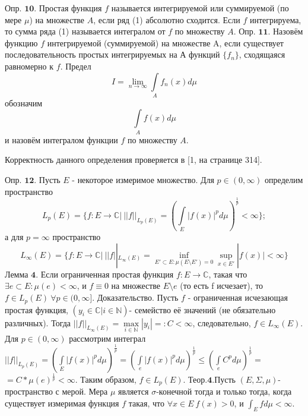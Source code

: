 \documentclass[a4paper,14pt]{article}
\begin{document}
$\textbf{Опр. 10.}$ Простая функция $f$ называется интегрируемой или суммируемой (по мере $\mu$) на множестве $A$, если ряд (1) абсолютно сходится. Если $f$ интегрируема, то сумма ряда (1) называется интегралом от $f$ по множеству $A$.\newline
$\textbf{Опр. 11.}$ Назовём функцию $f$ интегрируемой (суммируемой) на множестве A, если существует последовательность простых интегрируемых на А функций $\{f_n\}$, сходящаяся равномерно к $f$. Предел $$I=\lim\limits_{n\rightarrow\infty}\int\limits_A f_n(x)d\mu$$ обозначим $$\int\limits_A f(x)d\mu$$ и назовём интегралом функции $f$ по множеству $A$.

Корректность данного определения проверяется в [1, на странице 314].\newline

$\textbf{Опр. 12.}$ Пусть $E$ - некоторое измеримое множество. Для $p\in(0,\infty)$ определим пространство $$L_p(E)=\{f:E\rightarrow\mathbb{C}|\ ||f||_{L_p(E)}=(\int\limits_E |f(x)|^p d\mu)^{\frac{1}{p}}<\infty\};$$ а для $p=\infty$ пространство $$L_{\infty}(E)=\{f:E\rightarrow\mathbb{C}|\ ||f||_{L_{\infty}(E)}=\inf\limits_{E'\subset E:\mu (E\setminus E')=0}\sup\limits_{x\in E'}|f(x)|<\infty\}$$
$\textbf{Лемма 4.}$ Если ограниченная простая функция $f:E\rightarrow\mathbb{C}$, такая что $\exists e\subset E:\mu(e)<\infty$, и $f\equiv 0$ на множестве $E\setminus e$ (то есть f исчезает), то $f\in L_p(E)\ \forall p\in(0,\infty]$.\newline
$\textbf{Доказательство.}$ Пусть $f$ - ограниченная исчезающая простая функция, $(y_i\in\mathbb{C}| i\in\mathbb{N})$- семейство её значений (не обязательно различных). Тогда $||f||_{L_{\infty}(E)}=\max\limits_{i\in\mathbb{N}}|y_i|=:C<\infty$, следовательно, $f\in L_{\infty}(E)$. Для $p\in(0,\infty)$ рассмотрим интеграл $||f||_{L_p(E)}=(\int\limits_E |f(x)|^p d\mu)^{\frac{1}{p}}=(\int\limits_{e} |f(x)|^p d\mu)^{\frac{1}{p}}\leq (\int\limits_{e} C^p d\mu)^{\frac{1}{p}}=$\newline
$=C*\mu(e)^{\frac{1}{p}}<\infty$. Таким образом, $f\in L_p(E)$.\newline
$\textbf{Теор.4.}$Пусть $(E,\Sigma,\mu)$- пространство с мерой. Мера $\mu$ является $\sigma$-конечной тогда и только тогда, когда существует измеримая функция $f$ такая, что $\forall x\in E\ f(x)>0$, и $\int_E fd\mu<\infty$.\newline
\end{document}

